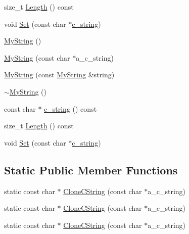 \begin{DoxyCompactItemize}
\item 
size\+\_\+t \mbox{\hyperlink{class_my_string_a4eb168b1ec401a732b3859abe004d648}{Length}} () const
\item 
void \mbox{\hyperlink{class_my_string_a521c4cd7eccac6ce554d8a51505e4970}{Set}} (const char $\ast$\mbox{\hyperlink{class_my_string_aff2af0cf30db39fe24a235670ee6ff25}{c\+\_\+string}})
\item 
\mbox{\hyperlink{class_my_string_a1cb17852b83614394b59720779c5f918}{My\+String}} ()
\item 
\mbox{\hyperlink{class_my_string_a28134eb91b6698f46b12accefa157d0f}{My\+String}} (const char $\ast$a\+\_\+c\+\_\+string)
\item 
\mbox{\hyperlink{class_my_string_ae24c7cf89a58dd2287303df2ac054c66}{My\+String}} (const \mbox{\hyperlink{class_my_string}{My\+String}} \&string)
\item 
\mbox{\hyperlink{class_my_string_a7bee4fe8ad82a0b7b8f65b02054b156b}{$\sim$\+My\+String}} ()
\item 
const char $\ast$ \mbox{\hyperlink{class_my_string_aff2af0cf30db39fe24a235670ee6ff25}{c\+\_\+string}} () const
\item 
size\+\_\+t \mbox{\hyperlink{class_my_string_a4eb168b1ec401a732b3859abe004d648}{Length}} () const
\item 
void \mbox{\hyperlink{class_my_string_a521c4cd7eccac6ce554d8a51505e4970}{Set}} (const char $\ast$\mbox{\hyperlink{class_my_string_aff2af0cf30db39fe24a235670ee6ff25}{c\+\_\+string}})
\end{DoxyCompactItemize}
\subsection*{Static Public Member Functions}
\begin{DoxyCompactItemize}
\item 
static const char $\ast$ \mbox{\hyperlink{class_my_string_a40753dcfa3314a8993f32bdd75d67ce2}{Clone\+C\+String}} (const char $\ast$a\+\_\+c\+\_\+string)
\item 
static const char $\ast$ \mbox{\hyperlink{class_my_string_a3acde3db40f8e70bad239739a5466275}{Clone\+C\+String}} (const char $\ast$a\+\_\+c\+\_\+string)
\item 
static const char $\ast$ \mbox{\hyperlink{class_my_string_a3acde3db40f8e70bad239739a5466275}{Clone\+C\+String}} (const char $\ast$a\+\_\+c\+\_\+string)
\end{DoxyCompactItemize}
